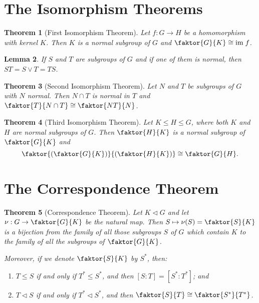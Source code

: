 \documentclass[12pt]{report}
\newtheorem{theorem}{Theorem}[chapter]
\newtheorem{lemma}[theorem]{Lemma}
\theoremstyle{definition}
\begin{document}
\section{The Isomorphism Theorems}

\begin{theorem}[First Isomorphism Theorem]
	Let $f:G\to H$ be a homomorphism with kernel $K$. Then $K$ is a normal subgroup of $G$ and $\faktor{G}{K}\cong \mathrm{im}\;f$.
\end{theorem}

\begin{lemma}
	If $S$ and $T$ are subgroups of $G$ and if one of them is normal, then $ST=S\vee T=TS$.
\end{lemma}

\begin{theorem}[Second Isomorphism Theorem]
	Let $N$ and $T$ be subgroups of $G$ with $N$ normal. Then $N\cap T$ is normal in $T$ and $\faktor{T}{N\cap T}\cong\faktor{NT}{N}$.
\end{theorem}

\begin{theorem}[Third Isomorphism Theorem]
	Let $K\leq H\leq G$, where both $K$ and $H$ are normal subgroups of $G$. Then $\faktor{H}{K}$ is a normal subgroup of $\faktor{G}{K}$ and
	\[ \faktor{\left(\faktor{G}{K}\right)}{\left(\faktor{H}{K}\right)}\cong\faktor{G}{H}. \]
\end{theorem}



\section{The Correspondence Theorem}

\begin{theorem}[Correspondence Theorem]
	Let $K\vartriangleleft G$ and let $\nu:G\to\faktor{G}{K}$ be the natural map.
	Then $S\mapsto\nu(S)=\faktor{S}{K}$ is a bijection from the family of all those subgroups $S$ of $G$ which contain $K$
	to the family of all the subgroups of $\faktor{G}{K}$.
	\par
	Moreover, if we denote $\faktor{S}{K}$ by $S^\ast$, then:
	\begin{enumerate}
		\item $T\leq S$ if and only if $T^\ast\leq S^\ast$, and then $[S:T]=[S^\ast:T^\ast]$; and
		\item $T\vartriangleleft S$ if and only if $T^\ast\vartriangleleft S^\ast$, and then $\faktor{S}{T}\cong\faktor{S^\ast}{T^\ast}$.
	\end{enumerate}
\end{theorem}
\end{document}
